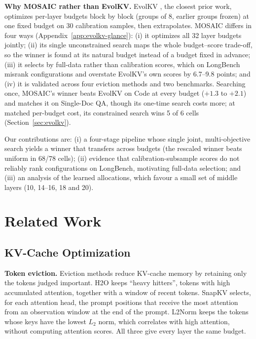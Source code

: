 \documentclass[11pt]{article}
\begin{document}
\textbf{Why MOSAIC rather than EvolKV.}\label{sec:intro-evolkv} EvolKV \citep{yu2025evolkv}, the closest prior work, optimizes per-layer budgets block by block (groups of 8, earlier groups frozen) at one fixed budget on 30 calibration samples, then extrapolates. MOSAIC differs in four ways (Appendix~\ref{app:evolkv-glance}): (i) it optimizes all 32 layer budgets jointly; (ii) its single unconstrained search maps the whole budget--score trade-off, so the winner is found at its natural budget instead of a budget fixed in advance; (iii) it selects by full-data rather than calibration scores, which on LongBench misrank configurations and overstate EvolKV's own scores by 6.7--9.8 points; and (iv) it is validated across four eviction methods and two benchmarks. Searching once, MOSAIC's winner beats EvolKV on Code at every budget ($+1.3$ to $+2.1$) and matches it on Single-Doc QA, though its one-time search costs more; at matched per-budget cost, its constrained search wins 5 of 6 cells (Section~\ref{sec:evolkv}).

Our contributions are: (i) a four-stage pipeline whose single joint, multi-objective search yields a winner that transfers across budgets (the rescaled winner beats uniform in 68/78 cells); (ii) evidence that calibration-subsample scores do not reliably rank configurations on LongBench, motivating full-data selection; and (iii) an analysis of the learned allocations, which favour a small set of middle layers (10, 14--16, 18 and 20).

\section{Related Work}

\subsection{KV-Cache Optimization}

\textbf{Token eviction.} Eviction methods reduce KV-cache memory by retaining only the tokens judged important. H2O \citep{zhang2023h2o} keeps ``heavy hitters'', tokens with high accumulated attention, together with a window of recent tokens. SnapKV \citep{li2024snapkv} selects, for each attention head, the prompt positions that receive the most attention from an observation window at the end of the prompt. L2Norm \citep{devoto2024l2norm} keeps the tokens whose keys have the lowest $L_2$ norm, which correlates with high attention, without computing attention scores. All three give every layer the same budget.
\end{document}
